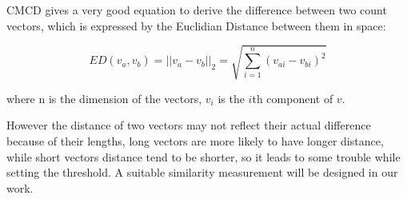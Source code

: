 \documentclass[conference]{IEEEtran}
\begin{document}
CMCD gives a very good equation to derive the difference between two count vectors, which is expressed by the Euclidian Distance between them in space:

\begin{equation}
ED(v_a, v_b) = ||v_a - v_b||_2 = \sqrt{\sum_{i=1}^n(v_{ai} - v_{bi})^2} \nonumber
\end{equation}

where n is the dimension of the vectors, $v_i$ is the $i$th component of $v$.

However the distance of two vectors may not reflect their actual difference because of their lengths, long vectors are more likely to have longer distance, while short vectors distance tend to be shorter, so it leads to some trouble while setting the threshold. A suitable similarity measurement will be designed in our work.





%
%

\end{document}
